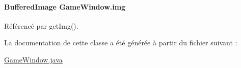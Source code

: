 \paragraph[{img}]{\setlength{\rightskip}{0pt plus 5cm}Buffered\+Image Game\+Window.\+img\hspace{0.3cm}{\ttfamily [private]}}\label{classGameWindow_a72d61cef747fc3a4b64d30078c833aed}


Référencé par get\+Img().



La documentation de cette classe a été générée à partir du fichier suivant \+:\begin{DoxyCompactItemize}
\item 
\hyperlink{GameWindow_8java}{Game\+Window.\+java}\end{DoxyCompactItemize}
